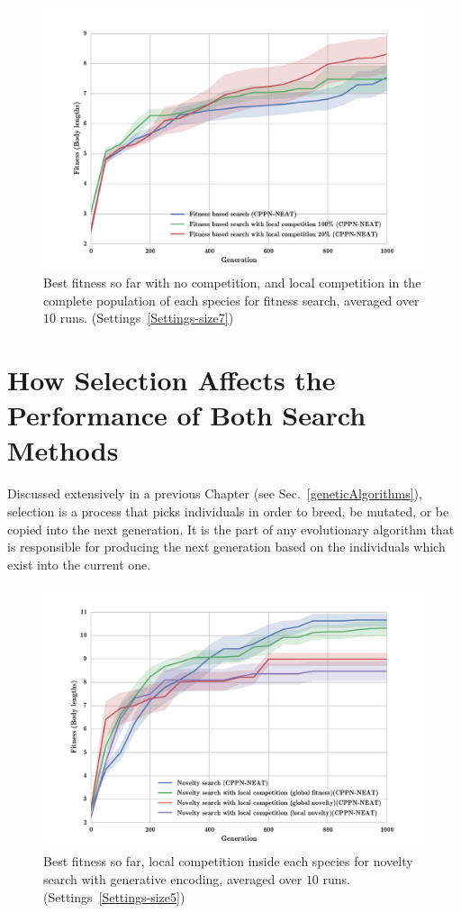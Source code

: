 \begin{figure}[t!]
\centering
\includegraphics[width=1.0\textwidth]{../Figures/Results/fitComp100_20percent.pdf}
\caption{Best fitness so far with no competition, and local competition in the complete population of each species for fitness search,  averaged over $10$ runs. (Settings~\ref{Settings-size7})}
\label{fig:fitComp100_20percent}
\end{figure}

\section{How Selection Affects the Performance of Both Search Methods}

Discussed extensively in a previous Chapter (see Sec.~\ref{geneticAlgorithms}), selection is a process that picks individuals in order to breed, be mutated, or be copied into the next generation. It is the part of any evolutionary algorithm that is responsible for producing the next generation based on the individuals which exist into the current one.


\begin{figure}[t!]
\centering
\includegraphics[width=1.0\textwidth]{../Figures/Results/NoveltyCompetitionsSize5.pdf}
\caption{Best fitness so far, local competition inside each species for novelty search with generative encoding, averaged over $10$ runs. (Settings~\ref{Settings-size5})}
\label{fig:NoveltyCompetitionsSize5}
\end{figure}


